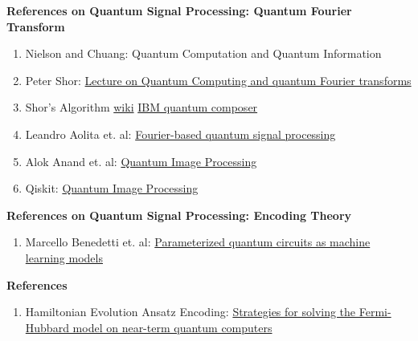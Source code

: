 \textbf{References on Quantum Signal Processing: Quantum Fourier Transform}
\begin{enumerate}
  \item Nielson and Chuang: Quantum Computation and Quantum Information
  \item Peter Shor: \href{https://www.cl.cam.ac.uk/teaching/1920/QuantComp/Quantum_Computing_Lecture_9.pdf}{Lecture on Quantum Computing
  and quantum Fourier transforms}
  \item Shor's Algorithm \href{https://en.wikipedia.org/wiki/Shor%27s_algorithm}{wiki} \href{https://quantum-computing.ibm.com/composer/docs/iqx/guide/shors-algorithm}{IBM quantum composer} 
  \item Leandro Aolita et. al: \href{https://arxiv.org/abs/2206.02826}{Fourier-based quantum signal processing}
  \item Alok Anand et. al: \href{https://arxiv.org/pdf/2203.01831.pdf}{Quantum Image Processing }
  \item Qiskit: \href{https://qiskit.org/textbook/ch-applications/image-processing-frqi-neqr.html}{Quantum Image Processing}
\end{enumerate}

\textbf{References on Quantum Signal Processing: Encoding Theory }
\begin{enumerate}
  \item Marcello Benedetti et. al: \href{https://iopscience.iop.org/article/10.1088/2058-9565/ab4eb5}{Parameterized quantum circuits as machine learning models
  }
\end{enumerate}

\textbf{References}
\begin{enumerate}
  \item Hamiltonian Evolution Ansatz Encoding: \href{https://journals.aps.org/prb/abstract/10.1103/PhysRevB.102.235122}{Strategies for solving the Fermi-Hubbard model on near-term quantum computers}
\end{enumerate}







